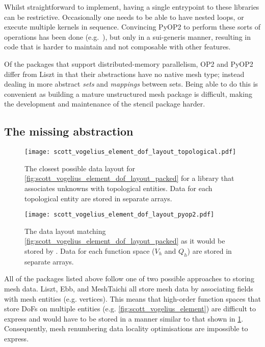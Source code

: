 \documentclass[thesis]{subfiles}
\begin{document}
Whilst straightforward to implement, having a single entrypoint to these libraries can be restrictive.
Occasionally one needs to be able to have nested loops, or execute multiple kernels in sequence.
Convincing PyOP2 to perform these sorts of operations has been done (e.g.~\cite{gibsonSlateExtendingFiredrake2020,farrellPCPATCHSoftwareTopological2021}), but only in a sui-generis manner, resulting in code that is harder to maintain and not composable with other features.

Of the packages that support distributed-memory parallelism, OP2 and PyOP2 differ from Liszt in that their abstractions have no native mesh type; instead dealing in more abstract \textit{sets} and \textit{mappings} between sets.
Being able to do this is convenient as building a mature unstructured mesh package is difficult, making the development and maintenance of the stencil package harder.

\subsection{The missing abstraction}
\label{sec:intro_missing_abstraction}

\begin{figure}
  \centering
  \texttt{[image: scott\_vogelius\_element\_dof\_layout\_topological.pdf]}
  \caption{
    The closest possible data layout for \cref{fig:scott_vogelius_element_dof_layout_packed} for a library that associates unknowns with topological entities.
    Data for each topological entity are stored in separate arrays.
  }
  \label{fig:scott_vogelius_element_dof_layout_topological}
\end{figure}

\begin{figure}
  \centering
  \texttt{[image: scott\_vogelius\_element\_dof\_layout\_pyop2.pdf]}
  \caption{
    The data layout matching \cref{fig:scott_vogelius_element_dof_layout_packed} as it would be stored by .
    Data for each function space ($V_h$ and $Q_h$) are stored in separate arrays.
  }
  \label{fig:scott_vogelius_element_dof_layout_pyop2}
\end{figure}

All of the packages listed above follow one of two possible approaches to storing mesh data.
Liszt, Ebb, and MeshTaichi all store mesh data by associating fields with mesh entities (e.g. vertices).
This means that high-order function spaces that store DoFs on multiple entities (e.g. \cref{fig:scott_vogelius_element}) are difficult to express and would have to be stored in a manner similar to that shown in \cref{fig:scott_vogelius_element_dof_layout_topological}.
Consequently, mesh renumbering data locality optimisations are impossible to express.
\end{document}
